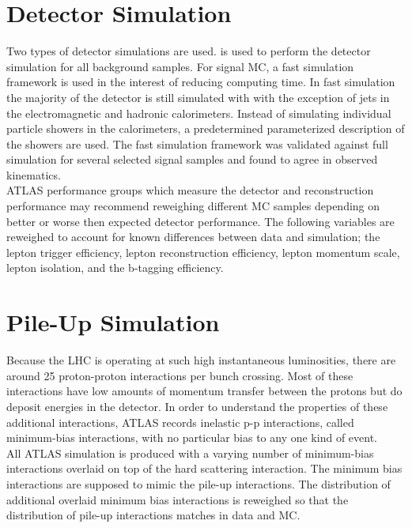 \section{Detector Simulation}
\label{sec:MC:DET}

\indent Two types of detector simulations are used.   \cite{Geant} is used to perform the detector simulation for all background samples.  For signal MC, a fast simulation framework is used in the interest of reducing computing time.\cite{ATLFAST}  In fast simulation the majority of the detector is still simulated with  with the exception of jets in the electromagnetic and hadronic calorimeters.  Instead of simulating individual particle showers in the calorimeters, a predetermined parameterized description of the showers are used.  The fast simulation framework was validated against full  simulation for several selected signal samples and found to agree in observed kinematics.  \\

\indent  ATLAS performance groups which measure the detector and reconstruction performance may recommend reweighing different MC samples depending on better or worse then expected detector performance.  The following variables are reweighed to account for known differences between data and simulation; the lepton trigger efficiency, lepton reconstruction efficiency, lepton momentum scale, lepton isolation, and the b-tagging efficiency. \\

\section{Pile-Up Simulation}
\label{sec:MC:PileUp}

\indent Because the LHC is operating at such high instantaneous luminosities, there are around 25 proton-proton interactions per bunch crossing.  Most of these interactions have low amounts of momentum transfer between the protons but do deposit energies in the detector.  In order to understand the properties of these additional interactions, ATLAS records inelastic p-p interactions, called minimum-bias interactions, with no particular bias to any one kind of event.  \\

\indent All ATLAS simulation is produced with a varying number of minimum-bias interactions overlaid on top of the hard scattering interaction.  The minimum bias interactions are supposed to mimic the pile-up interactions.  The distribution of additional overlaid minimum bias interactions is reweighed so that the distribution of pile-up interactions matches in data and MC.  \\

